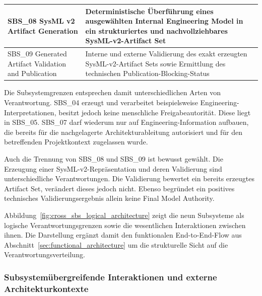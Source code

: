 \begin{table}[htbp]
\begin{tabular}{|p{4.8cm}|p{9.2cm}|}
SBS\_08 SysML v2 Artifact Generation &
Deterministische Überführung eines ausgewählten Internal Engineering Model
in ein strukturiertes und nachvollziehbares SysML-v2-Artifact Set \\
\hline

SBS\_09 Generated Artifact Validation and Publication &
Interne und externe Validierung des exakt erzeugten SysML-v2-Artifact Sets
sowie Ermittlung des technischen Publication-Blocking-Status \\
\hline
\end{tabular}
\end{table}

Die Subsystemgrenzen entsprechen damit unterschiedlichen Arten von
Verantwortung. SBS\_04 erzeugt und verarbeitet beispielsweise
Engineering-Interpretationen, besitzt jedoch keine menschliche
Freigabeautorität. Diese liegt in SBS\_05. SBS\_07 darf wiederum nur auf
Engineering-Information aufbauen, die bereits für die nachgelagerte
Architekturableitung autorisiert und für den betreffenden Projektkontext
zugelassen wurde.

Auch die Trennung von SBS\_08 und SBS\_09 ist bewusst gewählt. Die Erzeugung
einer SysML-v2-Repräsentation und deren Validierung sind unterschiedliche
Verantwortungen. Die Validierung bewertet ein bereits erzeugtes Artifact Set,
verändert dieses jedoch nicht. Ebenso begründet ein positives technisches
Validierungsergebnis allein keine Final Model Authority.

%
%

Abbildung~\ref{fig:cross_sbs_logical_architecture} zeigt die neun Subsysteme
als logische Verantwortungsgrenzen sowie die wesentlichen Interaktionen zwischen
ihnen. Die Darstellung ergänzt damit den funktionalen End-to-End-Flow aus
Abschnitt~\ref{sec:functional_architecture} um die strukturelle Sicht auf die
Verantwortungsverteilung.

\subsubsection{Subsystemübergreifende Interaktionen und externe Architekturkontexte}
\label{sec:cross_sbs_external_contexts}

